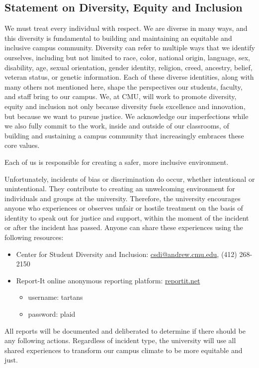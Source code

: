 \documentclass{article}
\begin{document}
\subsection*{Statement on Diversity, Equity and Inclusion}

We must treat every individual with respect. We are diverse in many ways, and
this diversity is fundamental to building and maintaining an equitable and
inclusive campus community. Diversity can refer to multiple ways that we
identify ourselves, including but not limited to race, color, national origin,
language, sex, disability, age, sexual orientation, gender identity, religion,
creed, ancestry, belief, veteran status, or genetic information. Each of these
diverse identities, along with many others not mentioned here, shape the
perspectives our students, faculty, and staff bring to our campus. We, at CMU,
will work to promote diversity, equity and inclusion not only because diversity
fuels excellence and innovation, but because we want to pursue justice. We
acknowledge our imperfections while we also fully commit to the work, inside and
outside of our classrooms, of building and sustaining a campus community that
increasingly embraces these core values.

Each of us is responsible for creating a safer, more inclusive environment.

Unfortunately, incidents of bias or discrimination do occur, whether intentional
or unintentional. They contribute to creating an unwelcoming environment for
individuals and groups at the university. Therefore, the university encourages
anyone who experiences or observes unfair or hostile treatment on the basis of
identity to speak out for justice and support, within the moment of the incident
or after the incident has passed. Anyone can share these experiences using the
following resources:

\begin{itemize}
    \item Center for Student Diversity and Inclusion: 
        \href{mailto:csdi@andrew.cmu.edu}{csdi@andrew.cmu.edu},
        (412) 268-2150
    \item Report-It online anonymous reporting platform: \url{reportit.net}
    \begin{itemize}
        \item username: tartans
        \item password: plaid
    \end{itemize}
\end{itemize}

All reports will be documented and deliberated to determine if there should be
any following actions. Regardless of incident type, the university will use all
shared experiences to transform our campus climate to be more equitable and
just.
\end{document}
